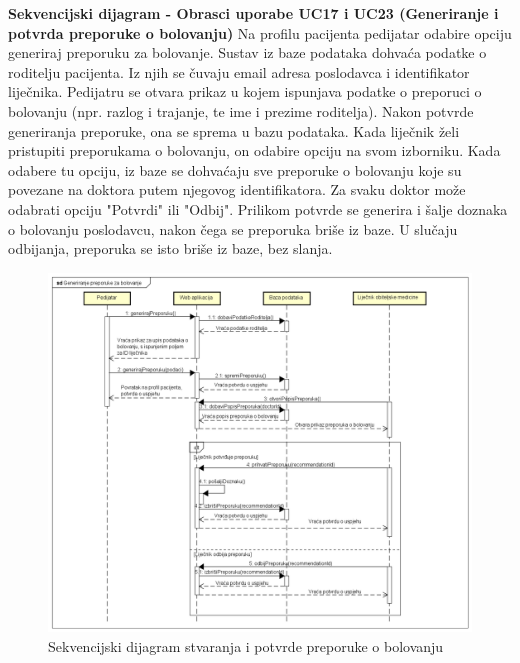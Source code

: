 				\textbf{Sekvencijski dijagram - Obrasci uporabe UC17 i UC23 (Generiranje i potvrda preporuke o bolovanju)}\newline
					\text Na profilu pacijenta pedijatar odabire opciju generiraj preporuku za bolovanje. Sustav iz baze podataka dohvaća podatke o roditelju pacijenta. Iz njih se čuvaju email adresa poslodavca i identifikator liječnika. Pedijatru se otvara prikaz u kojem ispunjava podatke o preporuci o bolovanju (npr. razlog i trajanje, te ime i prezime roditelja). Nakon potvrde generiranja preporuke, ona se sprema u bazu podataka.
					Kada liječnik želi pristupiti preporukama o bolovanju, on odabire opciju na svom izborniku. Kada odabere tu opciju, iz baze se dohvaćaju sve preporuke o bolovanju koje su povezane na doktora putem njegovog identifikatora. Za svaku doktor može odabrati opciju "Potvrdi" ili "Odbij". Prilikom potvrde se generira i šalje doznaka o bolovanju poslodavcu, nakon čega se preporuka briše iz baze. U slučaju odbijanja, preporuka se isto briše iz baze, bez slanja.
					\begin{figure}[H]
						\includegraphics[scale=0.4]{dijagrami/pedseq2.PNG} %
						\centering
						\caption{Sekvencijski dijagram stvaranja i potvrde preporuke o bolovanju}
						\label{fig:seq3}
					\end{figure}
					\clearpage
					
				
					
				\eject
	
